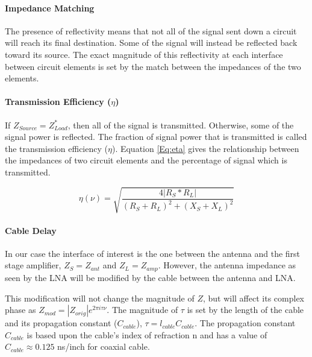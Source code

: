 \paragraph{Impedance Matching}

The presence of reflectivity means that not all of the signal sent down a circuit will reach its final destination. Some of the signal will instead be reflected back toward its source. The exact magnitude of this reflectivity at each interface between circuit elements is set by the match between the impedances of the two elements. 

\paragraph{Transmission Efficiency ($\eta$)}

If $Z_{Source} = Z^*_{Load}$, then all of the signal is transmitted. Otherwise, some of the signal power is reflected. The fraction of signal power that is transmitted is called the transmission efficiency ($\eta$). Equation \ref{Eq:eta} gives the relationship between the impedances of two circuit elements and the percentage of signal which is transmitted. 

\begin{equation} \label{Eq:eta}
\eta (\nu) = \sqrt{\frac{4 |R_{S}*R_{L}|}{(R_{S}+R_{L})^2+(X_{S}+X_{L})^2}}
\end{equation}

\paragraph{Cable Delay}

In our case the interface of interest is the one between the antenna and the first stage amplifier, $Z_S = Z_{ant}$ and $Z_L = Z_{amp}$. However, the antenna impedance as seen by the LNA will be modified by the cable between the antenna and LNA. 

This modification will not change the magnitude of $Z$, but will affect its complex phase as $Z_{mod} = |Z_{orig}| e^{2 \pi i \tau \nu }$. The magnitude of $\tau$ is set by the length of the cable and its propagation constant ($C_{cable}$), $\tau = l_{cable} C_{cable}$. The propagation constant $C_{cable}$ is based upon the cable's index of refraction n and has a value of $C_{cable} \approx 0.125$ ns/inch for coaxial cable. 

